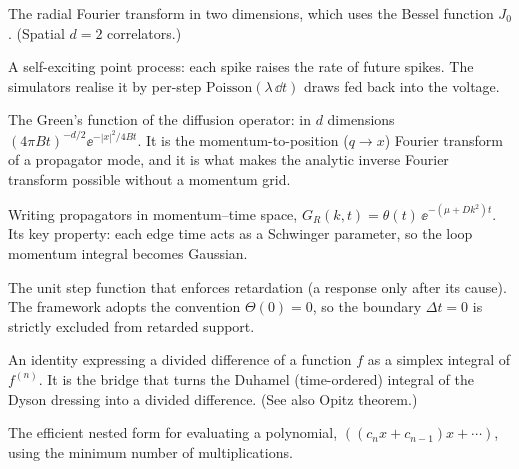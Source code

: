 \begin{description}[leftmargin=0pt,style=nextline]

  \item[Hankel transform / $J_0$] The radial Fourier transform in two dimensions,
        which uses the Bessel function $J_0$. (Spatial $d=2$ correlators.)

  \item[Hawkes process] A self-exciting point process: each spike raises the rate of
        future spikes. The simulators realise it by per-step
        $\mathrm{Poisson}(\lambda\,\dd t)$ draws fed back into the voltage.

  \item[Heat kernel] The Green's function of the diffusion operator: in $d$
        dimensions $(4\pi B t)^{-d/2}\ee^{-|x|^{2}/4Bt}$. It is the
        momentum-to-position ($q\to x$) Fourier transform of a propagator mode, and
        it is what makes the analytic inverse Fourier transform possible without a
        momentum grid.

  \item[Heat-kernel / $(k,t)$ representation] Writing propagators in
        momentum--time space, $G_R(k,t)=\theta(t)\,\ee^{-(\mu+Dk^{2})t}$. Its key
        property: each edge time acts as a Schwinger parameter, so the loop momentum
        integral becomes Gaussian.

  \item[Heaviside $\Theta(t)$] The unit step function that enforces retardation
        (a response only after its cause). The framework adopts the convention
        $\Theta(0)=0$, so the boundary $\Delta t=0$ is strictly excluded from
        retarded support.

  \item[Hermite--Genocchi formula] An identity expressing a divided difference of a
        function $f$ as a simplex integral of $f^{(n)}$. It is the bridge that turns
        the Duhamel (time-ordered) integral of the Dyson dressing into a divided
        difference. (See also Opitz theorem.)

  \item[Horner's rule] The efficient nested form for evaluating a polynomial,
        $((c_n x + c_{n-1})x + \cdots)$, using the minimum number of
        multiplications.

\end{description}

